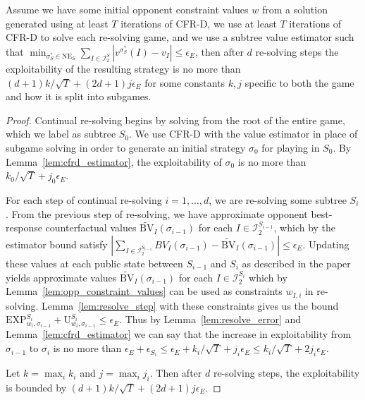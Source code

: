 \begin{theorem}
  Assume we have some initial opponent constraint values $w$ from a
  solution generated using at least $T$ iterations of CFR-D, we use at
  least $T$ iterations of CFR-D to solve each re-solving game, and we
  use a subtree value estimator such that $\min_{\sigma_S^* \in
    \text{NE}_S} \sum_{I \in \mathcal{I}^S_2} |v^{\sigma_S^*} (I)-v_I|
  \le \epsilon_E$, then after $d$ re-solving steps the exploitability
  of the resulting strategy is no more than $(d+1)k/\sqrt{T} +
  (2d+1)j\epsilon_E$ for some constants $k,j$ specific to both the
  game and how it is split into subgames.
  \label{thm:deepstack}
\end{theorem}
\begin{proof}
  Continual re-solving begins by solving from the root of the entire game, which we label as
  subtree $S_0$. We use CFR-D with the value estimator in place of subgame solving 
  in order to generate an initial strategy $\sigma_0$ for playing in $S_0$. 
  By Lemma~\ref{lem:cfrd_estimator}, the exploitability
  of $\sigma_0$ is no more than $k_0/\sqrt{T} + j_0\epsilon_E$.
  
  For each step of continual re-solving $i = 1,...,d$, we are re-solving some
  subtree $S_i$. From the previous step of re-solving, we have approximate opponent 
  best-response counterfactual values $\widetilde{\mathrm{BV}}_I(\sigma_{i-1})$ for each
  $I \in \mathcal{I}^{S_{i-1}}_2$, which by the estimator bound satisfy 
  $|\sum_{I \in \mathcal{I}^{S_{i-1}}_2} BV_I(\sigma_{i-1}) - \widetilde{\mathrm{BV}}_I(\sigma_{i-1})| \leq \epsilon_E$.
  Updating these values at each public state between $S_{i-1}$ and $S_{i}$ 
  as described in the paper yields approximate values $\widetilde{\mathrm{BV}}_I(\sigma_{i-1})$ 
  for each $I \in \mathcal{I}^{S_i}_2$ which by Lemma~\ref{lem:opp_constraint_values}
  can be used as constraints $w_{I,i}$ in re-solving. Lemma~\ref{lem:resolve_step} with these constraints
  gives us the bound $\text{EXP}^{S_i}_{w_i,\sigma_{i-1}} +
  \text{U}^{S_i}_{w_i,\sigma_{i-1}} \le \epsilon_E$.
  Thus by Lemma~\ref{lem:resolve_error} and Lemma~\ref{lem:cfrd_estimator} we
  can say that the increase in exploitability from $\sigma_{i-1}$ to
  $\sigma_i$ is no more than $\epsilon_E + \epsilon_{S_i} \leq \epsilon_E + k_i/\sqrt{T} + j_i\epsilon_E
  \leq  k_i/\sqrt{T} + 2j_i\epsilon_E$.

  Let $k = \max_i k_i$ and $j = \max_i j_i$. Then after $d$ re-solving
  steps, the exploitability is bounded by $(d+1)k/\sqrt{T} +
  (2d+1)j\epsilon_E$.
\end{proof}

